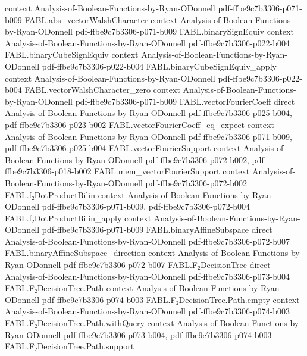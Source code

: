 \begin{theorem}
  {context}
  {Analysis-of-Boolean-Functions-by-Ryan-ODonnell}
  {pdf-ffbe9c7b3306-p071-b009}
\proofstep
  {FABL.abs_vectorWalshCharacter}
  {context}
  {Analysis-of-Boolean-Functions-by-Ryan-ODonnell}
  {pdf-ffbe9c7b3306-p071-b009}
\proofstep
  {FABL.binarySignEquiv}
  {context}
  {Analysis-of-Boolean-Functions-by-Ryan-ODonnell}
  {pdf-ffbe9c7b3306-p022-b004}
\proofstep
  {FABL.binaryCubeSignEquiv}
  {context}
  {Analysis-of-Boolean-Functions-by-Ryan-ODonnell}
  {pdf-ffbe9c7b3306-p022-b004}
\proofstep
  {FABL.binaryCubeSignEquiv_apply}
  {context}
  {Analysis-of-Boolean-Functions-by-Ryan-ODonnell}
  {pdf-ffbe9c7b3306-p022-b004}
\proofstep
  {FABL.vectorWalshCharacter_zero}
  {context}
  {Analysis-of-Boolean-Functions-by-Ryan-ODonnell}
  {pdf-ffbe9c7b3306-p071-b009}
\proofstep
  {FABL.vectorFourierCoeff}
  {direct}
  {Analysis-of-Boolean-Functions-by-Ryan-ODonnell}
  {pdf-ffbe9c7b3306-p025-b004,
    pdf-ffbe9c7b3306-p023-b002}
\proofstep
  {FABL.vectorFourierCoeff_eq_expect}
  {context}
  {Analysis-of-Boolean-Functions-by-Ryan-ODonnell}
  {pdf-ffbe9c7b3306-p071-b009,
    pdf-ffbe9c7b3306-p025-b004}
\proofstep
  {FABL.vectorFourierSupport}
  {context}
  {Analysis-of-Boolean-Functions-by-Ryan-ODonnell}
  {pdf-ffbe9c7b3306-p072-b002,
    pdf-ffbe9c7b3306-p018-b002}
\proofstep
  {FABL.mem_vectorFourierSupport}
  {context}
  {Analysis-of-Boolean-Functions-by-Ryan-ODonnell}
  {pdf-ffbe9c7b3306-p072-b002}
\proofstep
  {FABL.f₂DotProductBilin}
  {context}
  {Analysis-of-Boolean-Functions-by-Ryan-ODonnell}
  {pdf-ffbe9c7b3306-p071-b009,
    pdf-ffbe9c7b3306-p072-b004}
\proofstep
  {FABL.f₂DotProductBilin_apply}
  {context}
  {Analysis-of-Boolean-Functions-by-Ryan-ODonnell}
  {pdf-ffbe9c7b3306-p071-b009}
\proofstep
  {FABL.binaryAffineSubspace}
  {direct}
  {Analysis-of-Boolean-Functions-by-Ryan-ODonnell}
  {pdf-ffbe9c7b3306-p072-b007}
\proofstep
  {FABL.binaryAffineSubspace_direction}
  {context}
  {Analysis-of-Boolean-Functions-by-Ryan-ODonnell}
  {pdf-ffbe9c7b3306-p072-b007}
\proofstep
  {FABL.F₂DecisionTree}
  {direct}
  {Analysis-of-Boolean-Functions-by-Ryan-ODonnell}
  {pdf-ffbe9c7b3306-p073-b004}
\proofstep
  {FABL.F₂DecisionTree.Path}
  {context}
  {Analysis-of-Boolean-Functions-by-Ryan-ODonnell}
  {pdf-ffbe9c7b3306-p074-b003}
\proofstep
  {FABL.F₂DecisionTree.Path.empty}
  {context}
  {Analysis-of-Boolean-Functions-by-Ryan-ODonnell}
  {pdf-ffbe9c7b3306-p074-b003}
\proofstep
  {FABL.F₂DecisionTree.Path.withQuery}
  {context}
  {Analysis-of-Boolean-Functions-by-Ryan-ODonnell}
  {pdf-ffbe9c7b3306-p073-b004,
    pdf-ffbe9c7b3306-p074-b003}
\proofstep
  {FABL.F₂DecisionTree.Path.support}

\end{theorem}
